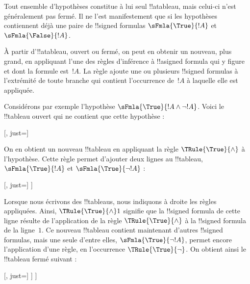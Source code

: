 \documentclass[11pt,a4paper,openany]{memoir}
\begin{document}
\begin{ex}
  Tout ensemble d'hypothèses constitue à lui seul !!a{tableau}, mais
  celui-ci n'est généralement pas fermé. Il ne l'est manifestement que
  si les hypothèses contiennent déjà une paire de !!{signed formula}s
  $\sFmla{\True}{!A}$ et~$\sFmla{\False}{!A}$.

  À partir d'!!a{tableau}, ouvert ou fermé, on peut en obtenir un nouveau,
  plus grand, en appliquant l'une des règles d'inférence à
  !!a{signed formula} qui y figure et dont la formule est~$!A$. La règle ajoute une ou plusieurs
  !!{signed formula}s à l'extrémité de toute branche qui contient
  l'occurrence de~$!A$ à laquelle elle est appliquée.

  Considérons par exemple l'hypothèse $\sFmla{\True}{!A \land \lnot
    !A}$. Voici le !!{tableau} ouvert qui ne contient que cette hypothèse :
  \begin{center}
    \begin{tableau}{}
      [, just=\TAss]
    \end{tableau}{}
  \end{center}
  On en obtient un nouveau !!{tableau} en appliquant la règle
  $\TRule{\True}{\land}$ à l'hypothèse. Cette règle permet d'ajouter
  deux lignes au !!{tableau}, $\sFmla{\True}{!A}$ et
  $\sFmla{\True}{\lnot !A}$ :
  \begin{center}
    \begin{tableau}{}
      [, just=\TAss
        [\sFmla{\True}{\formula{A}}, just={\TRule{\True}{\land}[1]},
          [\sFmla{\True}{\lnot \formula{A}}, just={\TRule{\True}{\land}[1]}
          ]
        ]
      ]
    \end{tableau}{}
  \end{center}
  Lorsque nous écrivons des !!{tableau}s, nous indiquons à droite les
  règles appliquées. Ainsi, $\TRule{\True}{\land} 1$ signifie que la
  !!{signed formula} de cette ligne résulte de l'application de la règle
  $\TRule{\True}{\land}$ à la !!{signed formula} de la ligne~$1$.
  Ce nouveau !!{tableau} contient maintenant d'autres
  !!{signed formula}s, mais une seule d'entre elles,
  $\sFmla{\True}{\lnot !A}$, permet encore l'application d'une règle,
  en l'occurrence $\TRule{\True}{\lnot}$. On obtient ainsi le
  !!{tableau} fermé suivant :
  \begin{center}
    \begin{tableau}{}
      [, just=\TAss
        [\sFmla{\True}{\formula{A}}, just={\TRule{\True}{\land}[1]}
          [\sFmla{\True}{\lnot \formula{A}}, just={\TRule{\True}{\land}[1]}
            [\sFmla{\False}{\formula{A}}, just={\TRule{\True}{\lnot}[3]}, close]
          ]
        ]
      ]
    \end{tableau}{}
  \end{center}
\end{ex}
\end{document}

